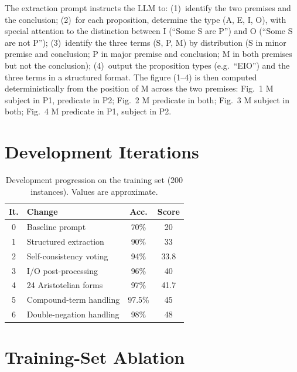 \documentclass[11pt]{article}
\begin{document}
The extraction prompt instructs the LLM to: (1)~identify the two premises and the conclusion; (2)~for each proposition, determine the type (A, E, I, O), with special attention to the distinction between I (``Some S are P'') and O (``Some S are not P''); (3)~identify the three terms (S, P, M) by distribution (S in minor premise and conclusion; P in major premise and conclusion; M in both premises but not the conclusion); (4)~output the proposition types (e.g.\ ``EIO'') and the three terms in a structured format.
The figure (1--4) is then computed deterministically from the position of M across the two premises: Fig.\ 1 M subject in P1, predicate in P2; Fig.\ 2 M predicate in both; Fig.\ 3 M subject in both; Fig.\ 4 M predicate in P1, subject in P2.

\section{Development Iterations}
\label{app:iterations}

\begin{table}[h]
\centering
\small
\begin{tabular}{@{}clcc@{}}
\toprule
\textbf{It.} & \textbf{Change} & \textbf{Acc.} & \textbf{Score} \\
\midrule
0 & Baseline prompt & 70\% & 20 \\
1 & Structured extraction & 90\% & 33 \\
2 & Self-consistency voting & 94\% & 33.8 \\
3 & I/O post-processing & 96\% & 40 \\
4 & 24 Aristotelian forms & 97\% & 41.7 \\
5 & Compound-term handling & 97.5\% & 45 \\
6 & Double-negation handling & 98\% & 48 \\
\bottomrule
\end{tabular}
\caption{Development progression on the training set (200 instances). Values are approximate.}
\label{tab:iterations}
\end{table}

\section{Training-Set Ablation}
\label{app:ablation}
\end{document}
